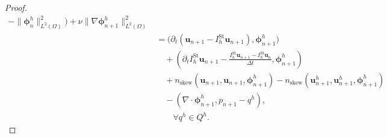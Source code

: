 \begin{proof}
\begin{equation}
\begin{aligned}
      -\|\symbf{\phi}_n^h\|_{L^2(\Omega)}^2\Bigr)
      +\nu\|\nabla\symbf{\phi}_{n+1}^h\|_{L^2(\Omega)}^2\\
 &=\bigl(\partial_t(\bm{u}_{n+1}-I_h^{\mathrm{St}}\bm{u}_{n+1}),
          \symbf{\phi}_{n+1}^h\bigr)\\
 &\quad+\left(\partial_t I_h^{\mathrm{St}}\bm{u}_{n+1}
       -\frac{I_h^{\mathrm{St}}\bm{u}_{n+1}
                 -I_h^{\mathrm{St}}\bm{u}_n}{\Delta t},
          \symbf{\phi}_{n+1}^h\right)\\
 &\quad+n_{\mathrm{skew}}(\bm{u}_{n+1},\bm{u}_{n+1},
                          \symbf{\phi}_{n+1}^h)
       -n_{\mathrm{skew}}(\bm{u}_{n+1}^h,\bm{u}_{n+1}^h,
                          \symbf{\phi}_{n+1}^h)\\
  &\quad-(\nabla\cdot\symbf{\phi}_{n+1}^h,p_{n+1}-q^h),\\
  &\qquad\forall q^h\in Q^h.
\end{aligned}
\end{equation}


\end{proof}
